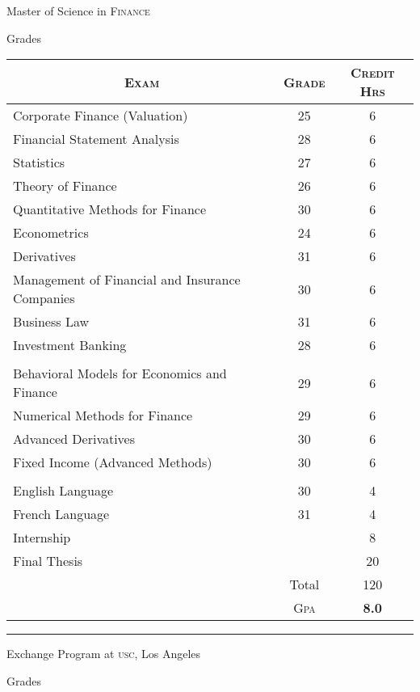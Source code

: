 \documentclass[a4paper,10pt]{article} %
\begin{document}
\par{\centering\Large \hypertarget{grds}{Master of Science in \textsc{Finance}}\par}\large{\centering Grades\par}\normalsize

\begin{center}
\begin{tabular}{lcc}
\multicolumn{1}{c}{\textsc{Exam}} & \textsc{Grade}&\textsc{Credit Hrs}\\ \hline
Corporate Finance (Valuation) & 25 & 6\\
Financial Statement Analysis & 28 & 6\\
Statistics & 27 & 6\\
Theory of Finance & 26 & 6\\
Quantitative Methods for Finance & 30 & 6\\
Econometrics & 24 & 6\\
Derivatives & 31 & 6\\
Management of Financial and Insurance Companies & 30 & 6\\
Business Law & 31 & 6\\
Investment Banking	& 28 & 6\\ \\
Behavioral Models for Economics and Finance	 & 29 & 6\\
Numerical Methods for Finance & 29 & 6\\
Advanced Derivatives & 30 & 6\\
Fixed Income (Advanced Methods) & 30 & 6\\ \\
English Language & 30 &	4\\
French Language & 31 &	4\\
Internship & & 8\\
Final Thesis & & 20\\
& Total & 120\\\cline{2-3}
&\textsc{Gpa}&\textbf{8.0}
\end{tabular}
\end{center}
\bigskip
\hrule
\bigskip


\bigskip

\par{\centering\Large \hypertarget{grds_usc}{Exchange Program at \textsc{usc}, Los Angeles}\par}\large{\centering Grades\par}\normalsize
\end{document}
